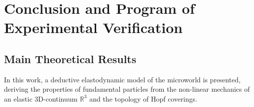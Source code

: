 \documentclass[12pt,a4paper]{article}
\begin{document}
		\section{Conclusion and Program of Experimental Verification}
		
		\subsection{Main Theoretical Results}
		In this work, a deductive elastodynamic model of the microworld is presented, deriving the properties of fundamental particles from the non-linear mechanics of an elastic 3D-continuum $\mathbb{R}^3$ and the topology of Hopf coverings.
		
\end{document}

